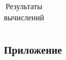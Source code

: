 \documentclass[a4paper,12pt]{article} %
\begin{document}
\begin{table}[h]
\begin{tabular}{l|cc|cc|cc|}
	\end{tabular}
	\caption{Результаты вычислений}
	\label{tab3}
\end{table}

\newpage

\subsection{Приложение}

\begin{figure}[h]
    \begin{minipage}[h]{0.5\linewidth}
    \end{minipage}
    \begin{minipage}[h]{0.5\linewidth}
    \end{minipage}
    \begin{minipage}[h]{0.5\linewidth}
    \end{minipage}
    \begin{minipage}[h]{0.5\linewidth}
    \end{minipage}
\end{figure}
\end{document}
